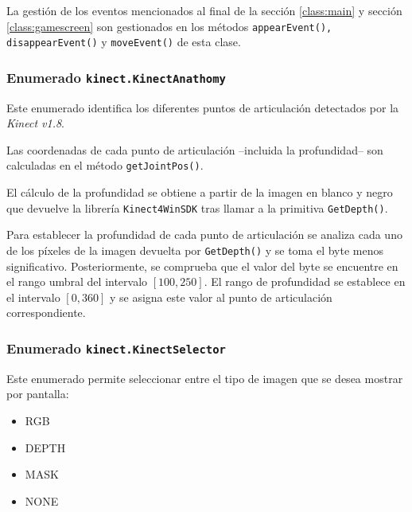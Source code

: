 \documentclass[10pt,a4paper]{report}
\begin{document}
	La gestión de los eventos mencionados al final de la sección \ref{class:main} y sección \ref{class:gamescreen} son gestionados en los métodos \texttt{appearEvent(), disappearEvent()} y \texttt{moveEvent()} de esta clase.
	
	
	
	
	\subsubsection{Enumerado \texttt{kinect.KinectAnathomy}}
	Este enumerado identifica los diferentes puntos de articulación detectados por la \textit{Kinect v1.8}.
	
	
	
	Las coordenadas de cada punto de articulación --incluida la profundidad-- son calculadas en el método \texttt{getJointPos()}.
	
	
	
	El cálculo de la profundidad se obtiene a partir de la imagen en blanco y negro que devuelve la librería \texttt{Kinect4WinSDK} tras llamar a la primitiva \texttt{GetDepth()}.
	
	Para establecer la profundidad de cada punto de articulación se analiza cada uno de los píxeles de la imagen devuelta por \texttt{GetDepth()} y se toma el byte menos significativo. Posteriormente, se comprueba que el valor del byte se encuentre en el rango umbral del intervalo $\left[ 100, 250\right]$. El rango de profundidad se establece en el intervalo $\left[ 0, 360\right]$ y se asigna este valor al punto de articulación correspondiente.
	
	
	
	
	\subsubsection{Enumerado \texttt{kinect.KinectSelector}}
	Este enumerado permite seleccionar entre el tipo de imagen que se desea mostrar por pantalla:
	\begin{itemize}
	\item RGB
	\item DEPTH
	\item MASK
	\item NONE
	\end{itemize}
	
\end{document}
